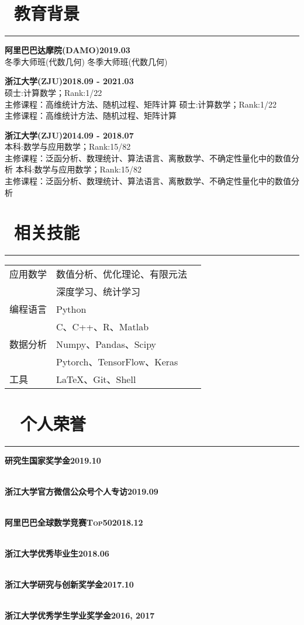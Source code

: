 \documentclass[a4paper, 11pt]{ctexart}
\newcommand{\CVitemA}[3]
{
	\textbf{{\kaishu#1}\hfill {\color{gray}#2} }  \\
	\ifx #3
	\else
	\small\fangsong #3\vspace{\parsep}
	\\[-2.0ex]
	\fi 
}
\newcommand{\starfouradd}{\faStar\faStar\faStar\faStar\faStarHalfEmpty}
\newcommand{\starfour}{\faStar\faStar\faStar\faStar\faStarO}
\newcommand{\starthreeadd}{\faStar\faStar\faStar\faStarHalfEmpty\faStarO}
\newcommand{\starthree}{\faStar\faStar\faStar\faStarO\faStarO}
\newcommand{\startwoadd}{\faStar\faStar\faStarHalfEmpty\faStarO\faStarO}
\begin{document}
\iffalse
  More
\fi 
\begin{multicols}{2}


\section*{\faGraduationCap~教育背景} \vspace{-0.25cm}\hrule
\CVitemA
{阿里巴巴达摩院(DAMO)} {2019.03}{冬季大师班(代数几何)}
\CVitemA
{浙江大学(ZJU)} {2018.09 - 2021.03}
{硕士:计算数学；Rank:1/22 \\ 
 主修课程：高维统计方法、随机过程、矩阵计算}
\CVitemA
{浙江大学(ZJU)} {2014.09 - 2018.07}
{本科:数学与应用数学；Rank:15/82\\
 主修课程：泛函分析、数理统计、算法语言、离散数学、不确定性量化中的数值分析}


\vspace{-.8cm}
\section*{\faCogs ~相关技能} \vspace{-0.25cm}\hrule	
\begin{tabular}{llc}
 应用数学 & 数值分析、优化理论、有限元法 & \starfouradd \\ 
          & 深度学习、统计学习 & \starfour\\ 
 编程语言 & Python  & \starfour \\ 
 		  & C、C++、R、Matlab  & \startwoadd \\ 
 数据分析 & Numpy、Pandas、Scipy &  \starfour \\ 
	      & Pytorch、TensorFlow、Keras  & \starthreeadd  \\
 工具     & LaTeX、Git、Shell & \starthree\\
\end{tabular} 


\vspace{.2cm}

\section*{\faTrophy ~  个人荣誉} \vspace{-0.25cm}\hrule
\CVitemA
{研究生国家奖学金} {2019.10}{}
\CVitemA
{浙江大学官方微信公众号个人专访} {2019.09}{}
\CVitemA
{阿里巴巴全球数学竞赛\textsc{Top}50} {2018.12}{}
\CVitemA
{浙江大学优秀毕业生} {2018.06}{}
\CVitemA
{浙江大学研究与创新奖学金} {2017.10}{}
\CVitemA
{浙江大学优秀学生学业奖学金} {2016, 2017}{}



\end{multicols}
\end{document}
